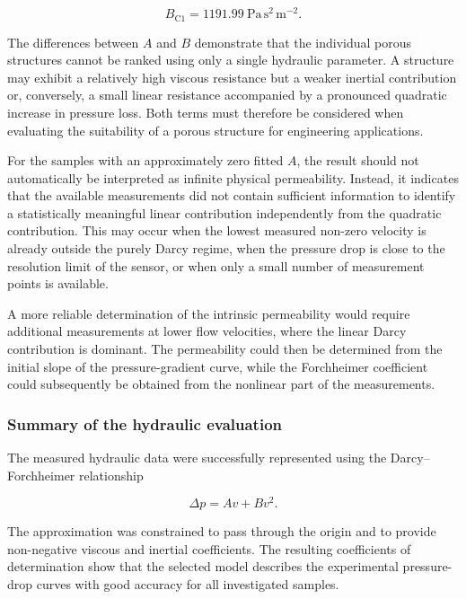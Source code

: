 \documentclass[a4paper]{article}
\begin{document}
\begin{equation}
    B_{\mathrm{C1}}
    =
    1191.99~\mathrm{Pa\,s^2\,m^{-2}}.
\end{equation}

The differences between \(A\) and \(B\) demonstrate that the individual porous structures cannot be ranked using only a single hydraulic parameter. A structure may exhibit a relatively high viscous resistance but a weaker inertial contribution or, conversely, a small linear resistance accompanied by a pronounced quadratic increase in pressure loss. Both terms must therefore be considered when evaluating the suitability of a porous structure for engineering applications.

For the samples with an approximately zero fitted \(A\), the result should not automatically be interpreted as infinite physical permeability. Instead, it indicates that the available measurements did not contain sufficient information to identify a statistically meaningful linear contribution independently from the quadratic contribution. This may occur when the lowest measured non-zero velocity is already outside the purely Darcy regime, when the pressure drop is close to the resolution limit of the sensor, or when only a small number of measurement points is available.

A more reliable determination of the intrinsic permeability would require additional measurements at lower flow velocities, where the linear Darcy contribution is dominant. The permeability could then be determined from the initial slope of the pressure-gradient curve, while the Forchheimer coefficient could subsequently be obtained from the nonlinear part of the measurements.

\subsubsection{Summary of the hydraulic evaluation}
\label{subsec:hydraulic_evaluation_summary}

The measured hydraulic data were successfully represented using the Darcy--Forchheimer relationship

\begin{equation}
    \Delta p = Av+Bv^2.
\end{equation}

The approximation was constrained to pass through the origin and to provide non-negative viscous and inertial coefficients. The resulting coefficients of determination show that the selected model describes the experimental pressure-drop curves with good accuracy for all investigated samples.
\end{document}
